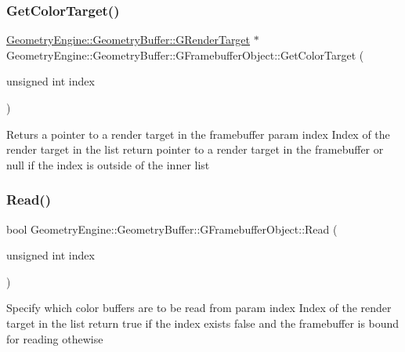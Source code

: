 \subsubsection{\texorpdfstring{GetColorTarget()}{GetColorTarget()}}
{\footnotesize\ttfamily \mbox{\hyperlink{class_geometry_engine_1_1_geometry_buffer_1_1_g_render_target}{Geometry\+Engine\+::\+Geometry\+Buffer\+::\+G\+Render\+Target}} $\ast$ Geometry\+Engine\+::\+Geometry\+Buffer\+::\+G\+Framebuffer\+Object\+::\+Get\+Color\+Target (\begin{DoxyParamCaption}\item[{unsigned int}]{index }\end{DoxyParamCaption})}

Returs a pointer to a render target in the framebuffer param index Index of the render target in the list return pointer to a render target in the framebuffer or null if the index is outside of the inner list \mbox{\label{class_geometry_engine_1_1_geometry_buffer_1_1_g_framebuffer_object_ac805af681fd2a966b9a73e10885ec4ad}} 
\subsubsection{\texorpdfstring{Read()}{Read()}}
{\footnotesize\ttfamily bool Geometry\+Engine\+::\+Geometry\+Buffer\+::\+G\+Framebuffer\+Object\+::\+Read (\begin{DoxyParamCaption}\item[{unsigned int}]{index }\end{DoxyParamCaption})}

Specify which color buffers are to be read from param index Index of the render target in the list return true if the index exists false and the framebuffer is bound for reading othewise \mbox{\label{class_geometry_engine_1_1_geometry_buffer_1_1_g_framebuffer_object_a52a27b64109fd6e3bfd03428454d2f05}} 
